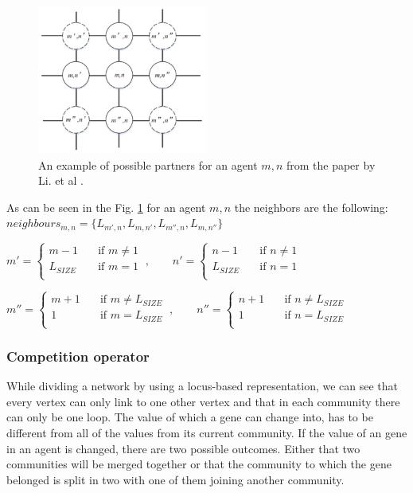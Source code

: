 \begin{figure}[H]
\begin{center}
\includegraphics[width=0.5\textwidth]{images/neighbours.png}
\caption{An example of possible partners for an agent $m,n$ from the paper by Li. et al \cite{Li2016}.}\label{fig:neighbours}
\end{center}
\end{figure}
\newpage
As can be seen in the Fig. \ref{fig:neighbours} for an agent $m,n$ the neighbors are the following:\\
$neighbours_{m,n} = \lbrace L_{m',n},L_{m,n'},L_{m'',n},L_{m,n''} \rbrace$
\begin{center}
$ m' =
  \begin{cases}
    m-1       & \quad \text{if } m \neq 1\\
    L_{SIZE}  & \quad \text{if } m = 1\\
  \end{cases}\:,\qquad
n' =
  \begin{cases}
    n-1       & \quad \text{if } n \neq 1\\
    L_{SIZE}  & \quad \text{if } n = 1\\
  \end{cases}
$

$ m'' =
  \begin{cases}
    m+1       & \quad \text{if } m \neq L_{SIZE}\\
    1  & \quad \text{if } m = L_{SIZE}\\
  \end{cases}\:,\qquad
n'' =
  \begin{cases}
    n+1       & \quad \text{if } n \neq L_{SIZE}\\
    1  & \quad \text{if } n = L_{SIZE}\\
  \end{cases}
$
\end{center}

\subsubsection{Competition operator}
While dividing a network by using a locus-based representation, we can see that every vertex can only link to one other vertex and that in each community there can only be one loop.
The value of which a gene can change into, has to be different from all of the values from its current community.
If the value of an gene in an agent is changed, there are two possible outcomes.
Either that two communities will be merged together or that the community to which the gene belonged is split in two with one of them joining another community.

